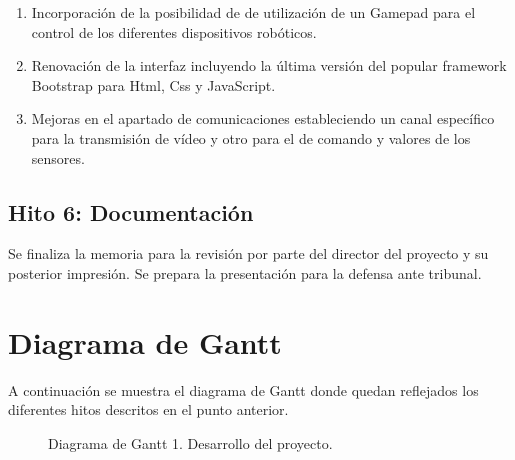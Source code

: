 \begin{enumerate}
 \item Incorporación de la posibilidad de de utilización de un Gamepad para el control de los diferentes dispositivos robóticos.
 \item Renovación de la interfaz incluyendo la última versión del popular framework Bootstrap para Html, Css y JavaScript.
 \item Mejoras en el apartado de comunicaciones estableciendo un canal específico para la transmisión de vídeo y otro para el de comando y valores de los sensores.
\end{enumerate}


\subsection{Hito 6: Documentación }
\label{subsec:hito6}

Se finaliza la memoria para la revisión por parte del director del proyecto y su posterior impresión. Se prepara la presentación para la defensa ante tribunal.

\section{Diagrama de Gantt}

A continuación se muestra el diagrama de Gantt donde quedan reflejados los diferentes hitos descritos en el punto anterior.

\begin{figure}
  \caption{Diagrama de Gantt 1. Desarrollo del proyecto.}
\end{figure}
